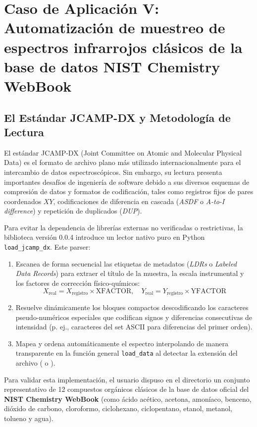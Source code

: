 \section{Caso de Aplicación V: Automatización de muestreo de espectros infrarrojos clásicos de la base de datos NIST Chemistry WebBook}

\subsection{El Estándar JCAMP-DX y Metodología de Lectura}
El estándar JCAMP-DX (Joint Committee on Atomic and Molecular Physical Data) es el formato de archivo plano más utilizado internacionalmente para el intercambio de datos espectroscópicos. Sin embargo, su lectura presenta importantes desafíos de ingeniería de software debido a sus diversos esquemas de compresión de datos y formatos de codificación, tales como registros fijos de pares coordenados $XY$, codificaciones de diferencia en cascada (\textit{ASDF} o \textit{A-to-I difference}) y repetición de duplicados (\textit{DUP}).

Para evitar la dependencia de librerías externas no verificadas o restrictivas, la biblioteca versión 0.0.4 introduce un lector nativo puro en Python \texttt{load\_jcamp\_dx}. Este parser:
\begin{enumerate}
    \item Escanea de forma secuencial las etiquetas de metadatos (\textit{LDRs} o \textit{Labeled Data Records}) para extraer el título de la muestra, la escala instrumental y los factores de corrección físico-químicos:
    \begin{equation}
        X_{\text{real}} = X_{\text{registro}} \times \text{XFACTOR}, \quad Y_{\text{real}} = Y_{\text{registro}} \times \text{YFACTOR}
    \end{equation}
    \item Resuelve dinámicamente los bloques compactos descodificando los caracteres pseudo-numéricos especiales que codifican signos y diferencias consecutivas de intensidad (p. ej., caracteres del set ASCII para diferencias del primer orden).
    \item Mapea y ordena automáticamente el espectro interpolando de manera transparente en la función general \texttt{load\_data} al detectar la extensión del archivo ( o ).
\end{enumerate}

Para validar esta implementación, el usuario dispuso en el directorio  un conjunto representativo de 12 compuestos orgánicos clásicos de la base de datos oficial del \textbf{NIST Chemistry WebBook} (como ácido acético, acetona, amoníaco, benceno, dióxido de carbono, cloroformo, ciclohexano, ciclopentano, etanol, metanol, tolueno y agua).

